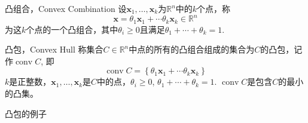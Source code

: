 
\begin{frame}

\begin{block}{凸组合，Convex Combination}
设$\mathbf{x}_1, \ldots, \mathbf{x}_k$为$\mathbb{R}^n$中的$k$个点，称
$$\mathbf{x} = \theta_1\mathbf{x}_1 + \cdots \theta_k\mathbf{x}_k \in \mathbb{R}^n$$
为这$k$个点的一个凸组合，其中$\theta_i \ge 0$且满足$\theta_1 + \cdots + \theta_k = 1$.
\end{block}

\vspace{1em}

\begin{block}{凸包，Convex Hull}
称集合$C\in\mathbb{R}^n$中点的所有的凸组合组成的集合为$C$的凸包，记作$\operatorname{conv} C$, 即
$$\operatorname{conv} C = \left\{ \theta_1\mathbf{x}_1 + \cdots \theta_k\mathbf{x}_k \right\}$$
$k$是正整数，$\mathbf{x}_1, \ldots, \mathbf{x}_k$是$C$中的点，$\theta_i \ge 0$, $\theta_1 + \cdots + \theta_k = 1$. $\operatorname{conv} C$是包含$C$的最小的凸集。
\end{block}

\end{frame}


\begin{frame}

\begin{block}{凸包的例子}
\begin{center}
\end{center}
\end{block}

\end{frame}


